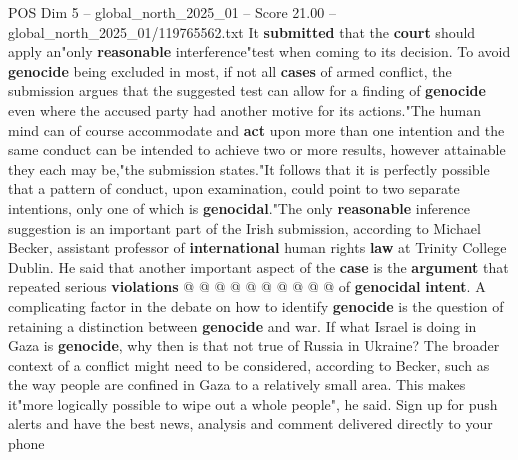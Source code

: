 \begin{textsample}{POS Dim 5 – global\_north\_2025\_01 – Score 21.00 – global\_north\_2025\_01/119765562.txt}
It \textbf{submitted} that the \textbf{court} should apply an"only \textbf{reasonable} interference"test when coming to its decision.
To avoid \textbf{genocide} being excluded in most, if not all \textbf{cases} of armed conflict, the submission argues that the suggested test can allow for a finding of \textbf{genocide} even where the accused party had another motive for its actions."The human mind can of course accommodate and \textbf{act} upon more than one intention and the same conduct can be intended to achieve two or more results, however attainable they each may be,"the submission states."It follows that it is perfectly possible that a pattern of conduct, upon examination, could point to two separate intentions, only one of which is \textbf{genocidal}."The only \textbf{reasonable} inference suggestion is an important part of the Irish submission, according to Michael Becker, assistant professor of \textbf{international} human rights \textbf{law} at Trinity College Dublin.
He said that another important aspect of the \textbf{case} is the \textbf{argument} that repeated serious \textbf{violations} @ @ @ @ @ @ @ @ @ @ of \textbf{genocidal} \textbf{intent}.
A complicating factor in the debate on how to identify \textbf{genocide} is the question of retaining a distinction between \textbf{genocide} and war.
If what Israel is doing in Gaza is \textbf{genocide}, why then is that not true of Russia in Ukraine?
The broader context of a conflict might need to be considered, according to Becker, such as the way people are confined in Gaza to a relatively small area.
This makes it"more logically possible to wipe out a whole people", he said.
Sign up for push alerts and have the best news, analysis and comment delivered directly to your phone

\end{textsample}
